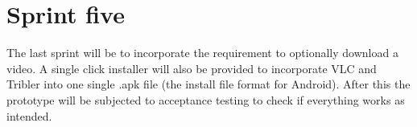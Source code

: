\section{Sprint five}
The last sprint will be to incorporate the requirement to optionally download a video. A single click installer will also be provided to incorporate VLC and Tribler into one single .apk file (the install file format for Android). After this the prototype will be subjected to acceptance testing to check if everything works as intended.